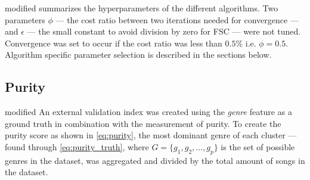 \documentclass[../report.tex]{subfiles}
\begin{document}
\begin{color}{modified}
 summarizes the hyperparameters of the different algorithms. Two parameters $\phi$ --- the cost ratio between two iterations needed for convergence --- and $\epsilon$ --- the small constant to avoid division by zero for FSC --- were not tuned. Convergence was set to occur if the cost ratio was less than $0.5\%$ i.e. $\phi = 0.5$. Algorithm specific parameter selection is described in the sections below.
\begin{table}[H]
\caption{Hyperparameters of the given algorithms ($\phi$, $\epsilon$ were set as constants a priori)}
\label{table:hyperparameters}
\end{table}
\end{color}


\subsection{Purity}
\begin{color}{modified}
An external validation index was created using the \textit{genre} feature as a ground truth in combination with the measurement of purity. To create the purity score as shown in \cref{eq:purity}, the most dominant genre of each cluster --- found through \cref{eq:purity_truth}, where $G = \{g_1,g_2,...,g_p\}$ is the set of possible genres in the dataset, was aggregated and divided by the total amount of songs in the dataset.
\end{color}
\end{document}
